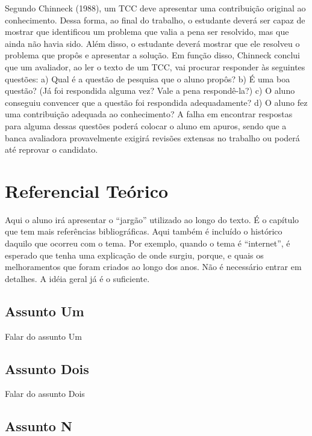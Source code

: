 \documentclass[
	12pt,				%
    oneside,			%
	a4paper,			%
	english,			%
	french,				%
	spanish,			%
	brazil,				%
	]{abntex2}
\begin{document}
Segundo Chinneck (1988), um TCC deve apresentar uma contribuição original ao conhecimento.
Dessa forma, ao final do trabalho, o estudante deverá ser capaz de mostrar que identificou um problema que
valia a pena ser resolvido, mas que ainda não havia sido. Além disso, o estudante deverá mostrar que ele
resolveu o problema que propôs e apresentar a solução.
Em função disso, Chinneck conclui que um avaliador, ao ler o texto de um TCC, vai procurar
responder às seguintes questões:
a) Qual é a questão de pesquisa que o aluno propôs?
b) É uma boa questão? (Já foi respondida alguma vez? Vale a pena respondê-la?)
c) O aluno conseguiu convencer que a questão foi respondida adequadamente?
d) O aluno fez uma contribuição adequada ao conhecimento?
A falha em encontrar respostas para alguma dessas questões poderá colocar o aluno em apuros, sendo que a
banca avaliadora provavelmente exigirá revisões extensas no trabalho ou poderá até reprovar o candidato.

\chapter{Referencial Teórico}

Aqui o aluno irá apresentar o “jargão” utilizado ao longo do texto. 
É o capítulo que tem mais referências bibliográficas. Aqui também é incluído o
histórico daquilo que ocorreu com o tema. Por exemplo, quando o tema é “internet”,
é esperado que tenha uma explicação de onde surgiu, porque, e quais os
melhoramentos que foram criados ao longo dos anos. Não é necessário entrar
em detalhes. A idéia geral já é o suficiente.

\section{Assunto Um}

Falar do assunto Um

\section{Assunto Dois}

Falar do assunto Dois

\section{Assunto N}
\end{document}
